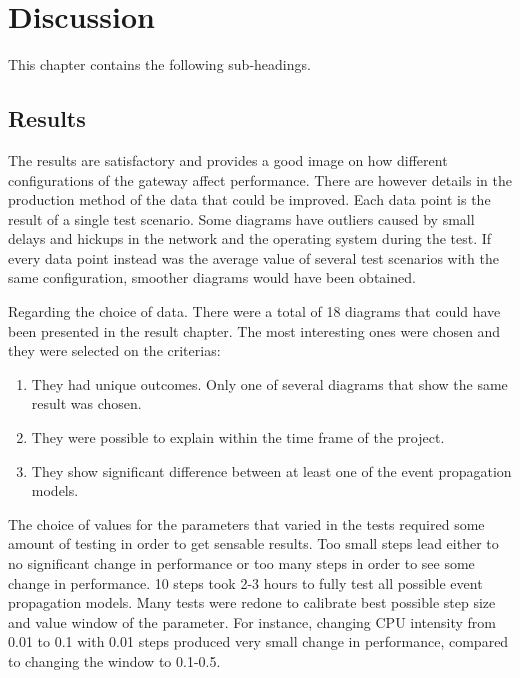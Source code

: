 \chapter{Discussion}
\label{cha:discussion}

This chapter contains the following sub-headings.

\section{Results}
\label{sec:discussion-results}

The results are satisfactory and provides a good image on how different
configurations of the gateway affect performance. There are however details in
the production method of the data that could be improved. Each data point is
the result of a single test scenario. Some diagrams have outliers caused by
small delays and hickups in the network and the operating system during the
test. If every data point instead was the average value of several test
scenarios with the same configuration, smoother diagrams would have been
obtained.

Regarding the choice of data. There were a total of 18 diagrams that could have
been presented in the result chapter. The most interesting ones were chosen and
they were selected on the criterias:

\begin{enumerate}
    \item They had unique outcomes. Only one of several diagrams that show the
        same result was chosen.
    \item They were possible to explain within the time frame of the project.
    \item They show significant difference between at least one of the event
        propagation models.
\end{enumerate}

The choice of values for the parameters that varied in the tests required some
amount of testing in order to get sensable results. Too small steps lead either
to no significant change in performance or too many steps in order to see some
change in performance. 10 steps took 2-3 hours to fully test all possible
event propagation models. Many tests were redone to calibrate best possible
step size and value window of the parameter. For instance, changing CPU
intensity from 0.01 to 0.1 with 0.01 steps produced very small change in
performance, compared to changing the window to 0.1-0.5.

